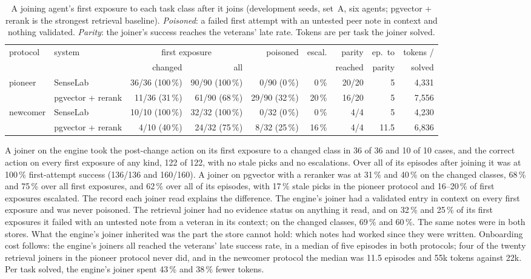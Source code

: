 \documentclass[11pt]{article}
\begin{document}
\begin{table}[t]
\centering\footnotesize
\caption{A joining agent's first exposure to each task class after it joins (development seeds,
set~A, six agents; pgvector + rerank is the strongest retrieval baseline). \emph{Poisoned}: a
failed first attempt with an untested peer note in context and nothing validated. \emph{Parity}:
the joiner's success reaches the veterans' late rate. Tokens are per task the joiner solved.}
\label{tab:join}
\setlength{\tabcolsep}{3pt}
\begin{tabular}{@{}llrrrrrrr@{}}
\toprule
protocol & system & \multicolumn{2}{c}{first exposure} & poisoned & escal. & parity & ep.\ to & tokens /\\
 & & changed & all & & & reached & parity & solved\\
\midrule
pioneer  & SenseLab          & 36/36 (100\,\%) & 90/90 (100\,\%) & 0/90 (0\,\%)  & 0\,\%  & 20/20 & 5    & 4,331\\
         & pgvector + rerank & 11/36 (31\,\%)  & 61/90 (68\,\%)  & 29/90 (32\,\%) & 20\,\% & 16/20 & 5    & 7,556\\
newcomer & SenseLab          & 10/10 (100\,\%) & 32/32 (100\,\%) & 0/32 (0\,\%)  & 0\,\%  & 4/4   & 5    & 4,230\\
         & pgvector + rerank & 4/10 (40\,\%)   & 24/32 (75\,\%)  & 8/32 (25\,\%)  & 16\,\% & 4/4   & 11.5 & 6,836\\
\bottomrule
\end{tabular}
\end{table}

A joiner on the engine took the post-change action on its first exposure to a changed class in
36 of 36 and 10 of 10 cases, and the correct action on every first exposure of any kind, 122 of
122, with no stale picks and no escalations. Over all of its episodes after joining it was at
100\,\% first-attempt success (136/136 and 160/160). A joiner on pgvector with a reranker was at
31\,\% and 40\,\% on the changed classes, 68\,\% and 75\,\% over all first exposures, and 62\,\%
over all of its episodes, with 17\,\% stale picks in the pioneer protocol and 16--20\,\% of first
exposures escalated. The record each joiner read explains the difference. The engine's joiner had
a validated entry in context on every first exposure and was never poisoned. The retrieval
joiner had no evidence status on anything it read, and on 32\,\% and 25\,\% of its first
exposures it failed with an untested note from a veteran in its context; on the changed classes,
69\,\% and 60\,\%. The same notes were in both stores. What the engine's joiner inherited was the
part the store cannot hold: which notes had worked since they were written. Onboarding cost
follows: the engine's joiners all reached the veterans' late success rate, in a median of five
episodes in both protocols; four of the twenty retrieval joiners in the pioneer protocol never
did, and in the newcomer protocol the median was 11.5 episodes and 55k tokens against 22k. Per
task solved, the engine's joiner spent 43\,\% and 38\,\% fewer tokens.
\end{document}
